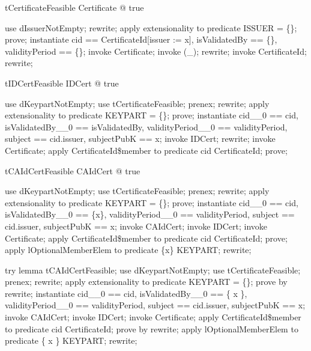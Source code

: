 \begin{theorem}{tCertificateFeasible}
\exists  Certificate @ true
\end{theorem}

\begin{zproof}[tCertificateFeasible]
use dIssuerNotEmpty;
rewrite;
apply extensionality to predicate ISSUER = \{\};
prove;
instantiate cid == \theta  CertificateId[issuer := x], isValidatedBy == \{\}, validityPeriod == \{\};
invoke Certificate;
invoke (\Optional \_);
rewrite;
invoke CertificateId;
rewrite;
\end{zproof}

\begin{theorem}{tIDCertFeasible}
\exists  IDCert @ true
\end{theorem}

\begin{zproof}[tIDCertFeasible]
use dKeypartNotEmpty;
use tCertificateFeasible;
prenex;
rewrite;
apply extensionality to predicate KEYPART = \{\};
prove;
instantiate cid\_\_0 == cid, isValidatedBy\_\_0 == isValidatedBy, validityPeriod\_\_0 == validityPeriod, subject == cid.issuer, subjectPubK == x;
invoke IDCert;
rewrite;
invoke Certificate;
apply CertificateId\$member to predicate cid \in  CertificateId;
prove;
\end{zproof}

\begin{theorem}{tCAIdCertFeasible}
\exists  CAIdCert @ true
\end{theorem}

\begin{zproof}[tCAIdCertFeasible]
use dKeypartNotEmpty;
use tCertificateFeasible;
prenex;
rewrite;
apply extensionality to predicate KEYPART = \{\};
prove;
instantiate cid\_\_0 == cid, isValidatedBy\_\_0 == \{x\}, validityPeriod\_\_0 == validityPeriod, subject == cid.issuer, subjectPubK == x;
invoke CAIdCert;
invoke IDCert;
invoke Certificate;
apply CertificateId\$member to predicate cid \in  CertificateId;
prove;
apply lOptionalMemberElem to predicate \{x\} \in  \Optional KEYPART;
rewrite;
\end{zproof}

try lemma tCAIdCertFeasible;
use dKeypartNotEmpty;
use tCertificateFeasible;
prenex;
rewrite;
apply extensionality to predicate KEYPART = \{\};
prove by rewrite;
instantiate
  cid\_\_0 == cid, isValidatedBy\_\_0 == \{ x \},
  validityPeriod\_\_0 == validityPeriod, subject == cid.issuer,
  subjectPubK == x;
invoke CAIdCert;
invoke IDCert;
invoke Certificate;
apply CertificateId\$member to predicate cid \in CertificateId;
prove by rewrite;
apply lOptionalMemberElem to predicate \{ x \} \in \Optional KEYPART;
rewrite;


